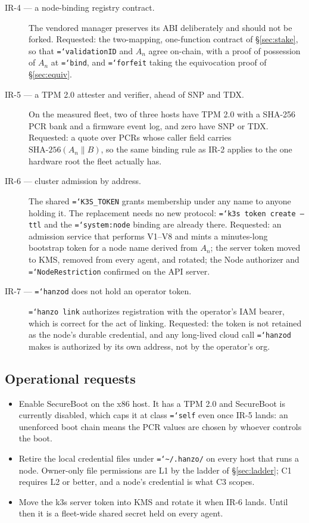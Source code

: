 \documentclass[11pt,a4paper]{article}
\newcommand{\code}[1]{\texttt{\hyphenchar\font=`\-\relax #1}}
\newcommand{\sha}[1]{\mathrm{SHA\text{-}#1}}
\begin{document}
\begin{description}
\item[IR-4 --- a node-binding registry contract.] The vendored manager preserves
  its ABI deliberately and should not be forked. Requested: the two-mapping,
  one-function contract of \S\ref{sec:stake}, so that \code{validationID} and $A_n$
  agree on-chain, with a proof of possession of $A_n$ at \code{bind}, and
  \code{forfeit} taking the equivocation proof of \S\ref{sec:equiv}.

\item[IR-5 --- a TPM 2.0 attester and verifier, ahead of SNP and TDX.] On the
  measured fleet, two of three hosts have TPM 2.0 with a SHA-256 PCR bank and a
  firmware event log, and zero have SNP or TDX. Requested: a quote over PCRs whose
  caller field carries $\sha{256}(A_n \| B)$, so the same binding rule as IR-2
  applies to the one hardware root the fleet actually has.

\item[IR-6 --- cluster admission by address.] The shared \code{K3S\_TOKEN} grants
  membership under any name to anyone holding it. The replacement needs no new
  protocol: \code{k3s token create --ttl} and the \code{system:node} binding are
  already there. Requested: an admission service that performs V1--V8 and mints a
  minutes-long bootstrap token for a node name derived from $A_n$; the server token
  moved to KMS, removed from every agent, and rotated; the Node authorizer and
  \code{NodeRestriction} confirmed on the API server.

\item[IR-7 --- \code{hanzod} does not hold an operator token.] \code{hanzo link}
  authorizes registration with the operator's IAM bearer, which is correct for the
  act of linking. Requested: the token is not retained as the node's durable
  credential, and any long-lived cloud call \code{hanzod} makes is authorized by
  its own address, not by the operator's org.
\end{description}

\subsection{Operational requests}

\begin{itemize}
\item Enable SecureBoot on the x86 host. It has a TPM 2.0 and SecureBoot is
  currently disabled, which caps it at class \code{self} even once IR-5 lands: an
  unenforced boot chain means the PCR values are chosen by whoever controls the
  boot.
\item Retire the local credential files under \code{\textasciitilde/.hanzo/} on
  every host that runs a node. Owner-only file permissions are L1 by the ladder of
  \S\ref{sec:ladder}; C1 requires L2 or better, and a node's credential is what C3
  scopes.
\item Move the k3s server token into KMS and rotate it when IR-6 lands. Until then
  it is a fleet-wide shared secret held on every agent.
\end{itemize}
\end{document}

